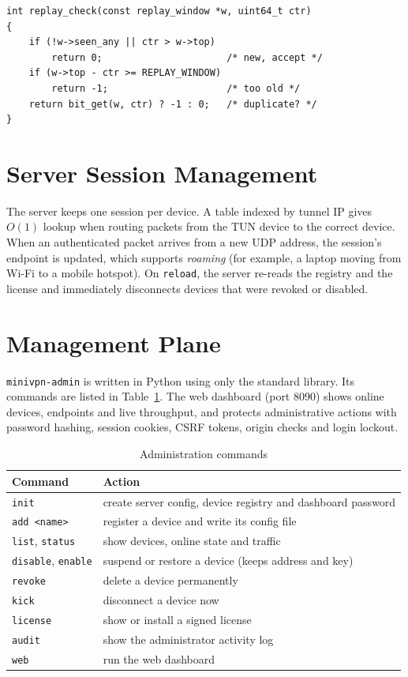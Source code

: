 \documentclass[12pt,a4paper]{report}
\begin{document}
\begin{lstlisting}[caption={Replay check (\texttt{src/replay.c})}]
int replay_check(const replay_window *w, uint64_t ctr)
{
    if (!w->seen_any || ctr > w->top)
        return 0;                      /* new, accept */
    if (w->top - ctr >= REPLAY_WINDOW)
        return -1;                     /* too old */
    return bit_get(w, ctr) ? -1 : 0;   /* duplicate? */
}
\end{lstlisting}

\section{Server Session Management}
The server keeps one session per device. A table indexed by tunnel IP gives
$O(1)$ lookup when routing packets from the TUN device to the correct device. When an
authenticated packet arrives from a new UDP address, the session's endpoint is updated,
which supports \emph{roaming} (for example, a laptop moving from Wi-Fi to a mobile
hotspot). On \texttt{reload}, the server re-reads the registry and the license and
immediately disconnects devices that were revoked or disabled.

\section{Management Plane}
\texttt{minivpn-admin} is written in Python using only the standard library. Its
commands are listed in Table~\ref{tab:admin}. The web dashboard (port 8090) shows
online devices, endpoints and live throughput, and protects administrative actions
with password hashing, session cookies, CSRF tokens, origin checks and login lockout.

\begin{table}[H]
\centering
\caption{Administration commands}
\label{tab:admin}
\begin{tabular}{@{}ll@{}}
\toprule
\textbf{Command} & \textbf{Action}\\
\midrule
\texttt{init} & create server config, device registry and dashboard password\\
\texttt{add <name>} & register a device and write its config file\\
\texttt{list}, \texttt{status} & show devices, online state and traffic\\
\texttt{disable}, \texttt{enable} & suspend or restore a device (keeps address and key)\\
\texttt{revoke} & delete a device permanently\\
\texttt{kick} & disconnect a device now\\
\texttt{license} & show or install a signed license\\
\texttt{audit} & show the administrator activity log\\
\texttt{web} & run the web dashboard\\
\bottomrule
\end{tabular}
\end{table}
\end{document}
